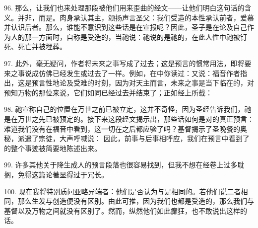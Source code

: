 96. 那么，让我们也来处理那段被他们用来歪曲的经文——让他们明白这句话的含义。并非，而是。肉身承认其主，颂扬声言圣父：我们受造的本性承认前者，爱慕并认识后者。那么，谁能不意识到这些话是在宣报呢？因此，圣子是在论及自己作为人的那一方面时，自称是受造的，当祂说：祂说的是祂的，在此人性中祂被钉死、死亡并被埋葬。\par

97. 此外，毫无疑问，作者将未来之事写成了过去；这是预言的惯常用法，即将要来之事说成仿佛已经发生或过去了一样。例如，在中你读过：又说：福音作者指出，这是预言性地论及受难的时刻，因为对天主而言，未来之事是当下临在的，对预知万物的那位来说，它们如同已经过去并结束了；正如经上所载：\par

98. 祂宣称自己的位置在万世之前已被立定，这并不奇怪，因为圣经告诉我们，祂是在万世之先已被预定的。接下来这段经文揭示出，那些话如何是对的真正预言：难道我们没有在福音中看到，这一切在之后都应验了吗？基督揭示了圣晚餐的奥秘，派遣了宗徒，大声呼喊说： 因此，前事与后事相呼应，我们在预言中看到了的整个事迹被简要地陈述出来。\par

99. 许多其他关于降生成人的预言段落也很容易找到，但我不想在经卷上过多耽搁，免得这篇论著显得过于冗长。\par

\par

100. 现在我将特别质问亚略异端者：他们是否认为与是相同的。若他们说二者相同，那么生发与创造便没有区别。由此可推，因为我们也都是受造的，那么我们与基督以及万物之间就没有区别了。然而，纵然他们如此癫狂，也不敢说出这样的话。\par


